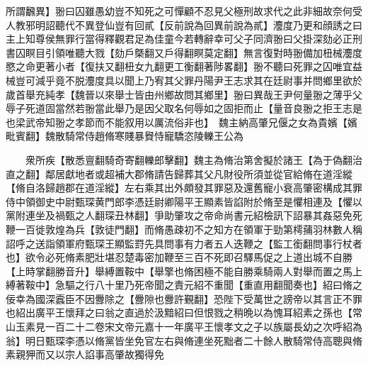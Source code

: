 所謂飜異】翂曰囚雖愚幼豈不知死之可憚顧不忍見父極刑故求代之此非細故奈何受人教邪明詔聽代不異登仙豈有回貳【反前說為回異前說為貳】灋度乃更和顔誘之曰主上知尊侯無罪行當得釋觀君足為佳童今若轉辭幸可父子同濟翂曰父掛深劾必正刑書囚瞑目引領唯聽大戮【劾戶槩翻又戶得翻瞑莫定翻】無言復對時翂備加杻械灋度愍之命更著小者【復扶又翻杻女九翻更工衡翻著陟畧翻】翂不聽曰死罪之囚唯宜益械豈可減乎竟不脱灋度具以聞上乃宥其父罪丹陽尹王志求其在廷尉事并問鄉里欲於歲首舉充純孝【魏晉以來舉士皆由州鄉故問其鄉里】翂曰異哉王尹何量翂之薄乎父辱子死道固當然若翂當此舉乃是因父取名何辱如之固拒而止【量音良翂之拒王志是也梁武帝知翂之孝節而不能叙用以厲流俗非也】　魏主納高肇兄偃之女為貴嬪【嬪毗賓翻】魏散騎常侍趙脩寒賤暴䝿恃寵驕恣陵轢王公為

　　衆所疾【散悉亶翻騎奇寄翻轢郎擊翻】魏主為脩治第舍擬於諸王【為于偽翻治直之翻】鄰居獻地者或超補大郡脩請告歸葬其父凡財役所須並從官給脩在道淫縱【脩自洛歸趙郡在道淫縱】左右乘其出外頗發其罪惡及還舊寵小衰高肇密構成其罪侍中領御史中尉甄琛黄門郎李憑廷尉卿陽平王顯素皆諂附於脩至是懼相連及【懼以黨附連坐及禍甄之人翻琛丑林翻】爭助肇攻之帝命尚書元紹檢訊下詔暴其姦惡免死鞭一百徙敦煌為兵【敦徒門翻】而脩愚疎初不之知方在領軍于勁第樗蒱羽林數人稱詔呼之送詣領軍府甄琛王顯監罸先具問事有力者五人迭鞭之【監工銜翻問事行杖者也】欲令必死脩素肥壯堪忍楚毒密加鞭至三百不死即召驛馬促之上道出城不自勝【上時掌翻勝音升】舉縛置鞍中【舉擎也脩困極不能自勝乘騎兩人對舉而置之馬上縛著鞍中】急驅之行八十里乃死帝聞之責元紹不重聞【重直用翻聞奏也】紹曰脩之佞幸為國深蠧臣不因釁除之【釁隙也釁許覲翻】恐陛下受萬世之謗帝以其言正不罪也紹出廣平王懷拜之曰翁之直過於汲黯紹曰但恨戮之稍晩以為愧耳紹素之孫也【常山玉素見一百二十二卷宋文帝元嘉十一年廣平王懷孝文之子以族屬長幼之次呼紹為翁】明日甄琛李憑以脩黨皆坐免官左右與脩連坐死黜者二十餘人散騎常侍高聰與脩素親狎而又以宗人諂事高肇故獨得免

